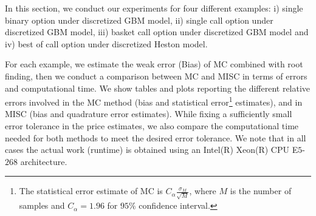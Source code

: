 In this section, we conduct our experiments for four different examples: i) single binary option under discretized GBM model, ii) single call option under discretized GBM model, iii) basket call option under discretized GBM model and iv) best of call option under discretized Heston model.

For each example, we estimate the weak error  (Bias) of MC combined with root finding, then we conduct a comparison between MC and MISC in terms of errors and computational time. We show tables and plots reporting  the different relative errors involved in the MC method (bias and statistical error\footnote{The statistical error estimate of MC is  $C_{\alpha} \frac{\sigma_M}{\sqrt{M}}$, where $M$ is the number of samples and $C_{\alpha}=1.96$ for $95\%$ confidence interval.}  estimates), and in MISC (bias and quadrature error estimates).  While fixing  a  sufficiently small error tolerance in the price estimates,  we also compare the computational time needed for both methods to meet the desired error tolerance.  We note that  in all cases the actual work (runtime) is obtained using an Intel(R) Xeon(R) CPU E$5$-$268$ architecture. 

